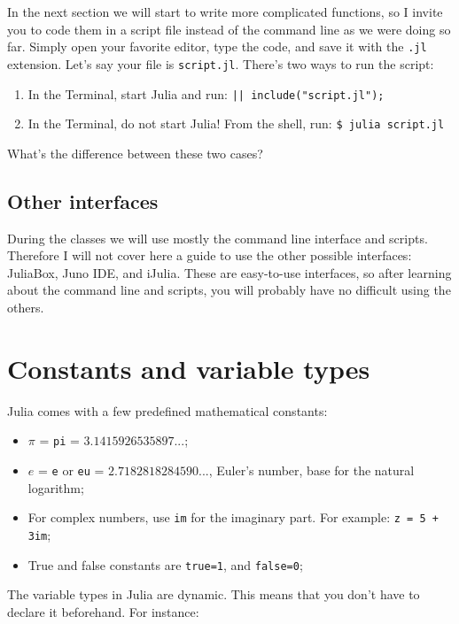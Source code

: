 In the next section we will start to write more complicated functions, so I invite you to code them in a script file instead of the command line as we were doing so far. Simply open your favorite editor, type the code, and save it with the \texttt{.jl} extension. Let's say your file is \texttt{script.jl}. There's two ways to run the script:

\begin{enumerate}
 \item In the Terminal, start Julia and run: \texttt{|\julia| include("script.jl");}
 \item In the Terminal, do not start Julia! From the shell, run: \texttt{\$ julia script.jl}
\end{enumerate}

What's the difference between these two cases?


\subsection{Other interfaces}

During the classes we will use mostly the command line interface and scripts. Therefore I will not cover here a guide to use the other possible interfaces: JuliaBox, Juno IDE, and iJulia. These are easy-to-use interfaces, so after learning about the command line and scripts, you will probably have no difficult using the others.



\section{Constants and variable types}

Julia comes with a few predefined mathematical constants:

\begin{itemize}
 \item $\pi$ = \texttt{pi} = $3.1415926535897...$;
 \item $e$ = \texttt{e} or \texttt{eu} = $2.7182818284590...$, Euler's number, base for the natural logarithm;
 \item For complex numbers, use \texttt{im} for the imaginary part. For example: \texttt{z = 5 + 3im};
 \item True and false constants are \texttt{true=1}, and \texttt{false=0};
\end{itemize}

The variable types in Julia are dynamic. This means that you don't have to declare it beforehand. For instance:


